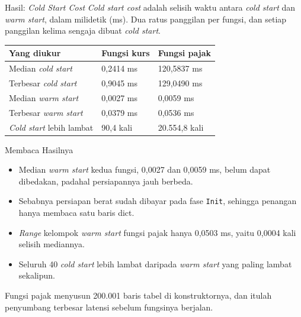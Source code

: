 \documentclass[aspectratio=169, table, 12pt]{beamer}
\begin{document}
\begin{frame}{{\Large Hasil: \textit{Cold Start Cost}}}
  \vspace{10pt}
  {\small \textit{Cold start cost} adalah selisih waktu antara \textit{cold
  start} dan \textit{warm start}, dalam milidetik (ms). Dua ratus panggilan per
  fungsi, dan setiap panggilan kelima sengaja dibuat \textit{cold start}.}

  \vspace{4pt}
  \centering
  \small
  \begin{tabularx}{0.96\textwidth}{|X|l|l|}
    \hline
    \textbf{Yang diukur} & \textbf{Fungsi kurs} & \textbf{Fungsi pajak} \\
    \hline
    Median \textit{cold start} & 0,2414 ms & 120,5837 ms \\
    \hline
    Terbesar \textit{cold start} & 0,9045 ms & 129,0490 ms \\
    \hline
    Median \textit{warm start} & 0,0027 ms & 0,0059 ms \\
    \hline
    Terbesar \textit{warm start} & 0,0379 ms & 0,0536 ms \\
    \hline
    \textit{Cold start} lebih lambat & 90,4 kali & 20.554,8 kali \\
    \hline
  \end{tabularx}
\end{frame}

\begin{frame}{{\Large Membaca Hasilnya}}
  \vspace{10pt}
  \begin{itemize}\small
    \item Median \textit{warm start} kedua fungsi, 0,0027 dan 0,0059 ms, belum
          dapat dibedakan, padahal persiapannya jauh berbeda.
    \item Sebabnya persiapan berat sudah dibayar pada fase \texttt{Init},
          sehingga penangan hanya membaca satu baris dict.
    \item \textit{Range} kelompok \textit{warm start} fungsi pajak hanya
          0,0503 ms, yaitu 0,0004 kali selisih mediannya.
    \item Seluruh 40 \textit{cold start} lebih lambat daripada \textit{warm
          start} yang paling lambat sekalipun.
  \end{itemize}

  \vspace{8pt}
  {\small Fungsi pajak menyusun 200.001 baris tabel di konstruktornya, dan
  itulah penyumbang terbesar latensi sebelum fungsinya berjalan.}
\end{frame}
\end{document}
